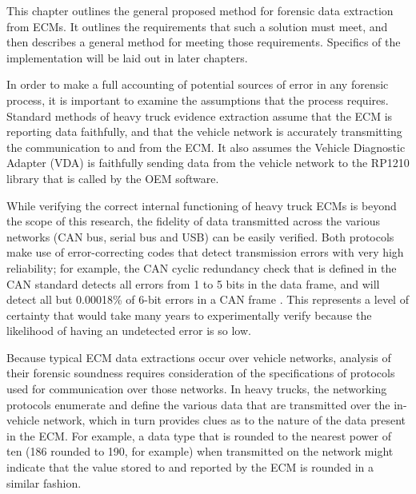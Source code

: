 
This chapter outlines the general proposed method for forensic data extraction from ECMs. It outlines the requirements that such a solution must meet,
and then describes a general method for meeting those requirements. Specifics of the implementation will be laid out in later chapters.



In order to make a full accounting of potential sources of error in any forensic process, it is important to examine the assumptions that the process requires. Standard methods of 
heavy truck evidence extraction assume that the ECM is reporting data faithfully, and that the vehicle network is accurately transmitting the communication to and from the ECM. It also assumes 
the Vehicle Diagnostic Adapter (VDA) is faithfully sending data from the vehicle network to the RP1210 library that is called by the OEM software.

While verifying the correct internal functioning of heavy truck ECMs is beyond the scope of this research, the fidelity of data transmitted across the various networks (CAN bus, serial 
bus and USB) can be easily verified. Both protocols make use of error-correcting codes that detect transmission errors with very high reliability; for example, the CAN 
cyclic redundancy check that is defined in the CAN standard detects all errors from 1 to 5 bits in the data frame, and will detect all but 0.00018\% of 6-bit 
errors in a CAN frame \cite{koopman2004}. This represents a level of certainty that would take many years to experimentally verify because the likelihood of having an undetected error is so low.


Because typical ECM data extractions occur over vehicle networks, analysis of their forensic soundness requires consideration of the specifications
of protocols  used for communication over those networks.
In heavy trucks, the networking protocols enumerate and define the various data that are transmitted over the in-vehicle network, which in turn provides clues as to the nature 
of the data present in the ECM. For example, a data type that is rounded to the nearest power of ten (186 rounded to 190, for example) when transmitted on the network might 
indicate that the value stored to and reported by the ECM is rounded in a similar fashion.


